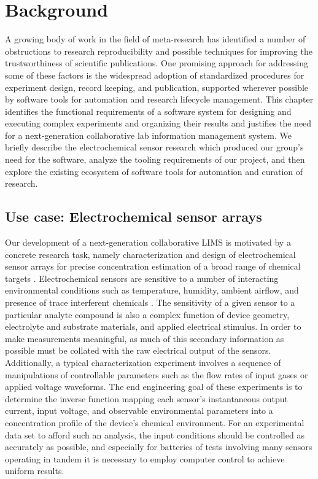 \documentclass[../thesis]{subfiles}
\begin{document}
\chapter{Background}

A growing body of work in the field of meta-research has identified a
number of obstructions to research reproducibility and possible
techniques for improving the trustworthiness of scientific
publications. One promising approach for addressing some of these
factors is the widespread adoption of standardized procedures for
experiment design, record keeping, and publication, supported wherever
possible by software tools for automation and research lifecycle
management. This chapter identifies the functional requirements of a
software system for designing and executing complex experiments and
organizing their results and justifies the need for a next-generation
collaborative lab information management system. We briefly describe
the electrochemical sensor research which produced our group's need
for the software, analyze the tooling requirements of our project, and
then explore the existing ecosystem of software tools for automation
and curation of research.



\section{Use case: Electrochemical sensor arrays}

Our development of a next-generation collaborative \gls{LIMS} is motivated
by a concrete research task, namely characterization and design of
electrochemical sensor arrays for precise concentration estimation of
a broad range of chemical targets \cite{Li2014, Wang2016,
  Wang2014}. Electrochemical sensors are sensitive to a number of
interacting environmental conditions such as temperature, humidity,
ambient airflow, and presence of trace interferent chemicals
\cite{Marco2012}. The sensitivity of a given sensor to a particular analyte compound is also
a complex function of device geometry, electrolyte and substrate
materials, and applied electrical stimulus. In order to make
measurements meaningful, as much of this secondary information as
possible must be collated with the raw electrical output of the
sensors. Additionally, a typical characterization experiment involves
a sequence of manipulations of controllable parameters such as the
flow rates of input gases or applied voltage waveforms. The end
engineering goal of these experiments is to determine the inverse
function mapping each sensor's instantaneous output current, input
voltage, and observable environmental parameters into a concentration
profile of the device's chemical environment. For an experimental data
set to afford such an analysis, the input conditions should be
controlled as accurately as possible, and especially for batteries of
tests involving many sensors operating in tandem it is necessary to
employ computer control to achieve uniform results.
\end{document}
